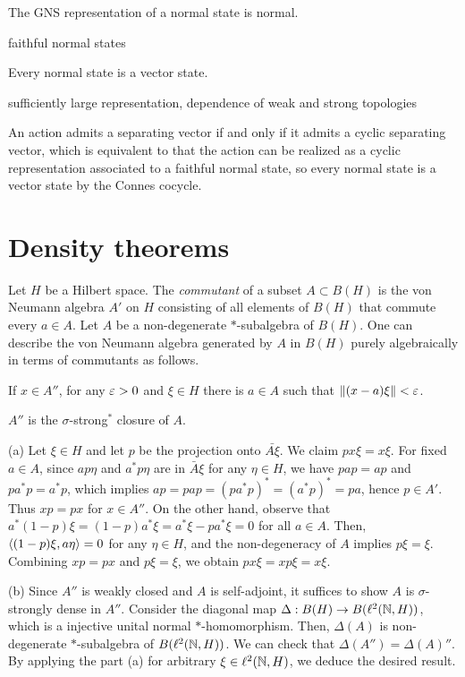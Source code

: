 \documentclass{../../large}
\begin{document}
\begin{prb}
\begin{parts}
\item The GNS representation of a normal state is normal.
\item faithful normal states
\item Every normal state is a vector state.
\item sufficiently large representation, dependence of weak and strong topologies
\end{parts}
\end{prb}


An action admits a separating vector if and only if it admits a cyclic separating vector, which is equivalent to that the action can be realized as a cyclic representation associated to a faithful normal state, so every normal state is a vector state by the Connes cocycle.

\section{Density theorems}



\begin{prb}
Let $H$ be a Hilbert space.
The \emph{commutant} of a subset $A\subset B(H)$ is the von Neumann algebra $A'$ on $H$ consisting of all elements of $B(H)$ that commute every $a\in A$.
Let $A$ be a non-degenerate $*$-subalgebra of $B(H)$.
One can describe the von Neumann algebra generated by $A$ in $B(H)$ purely algebraically in terms of commutants as follows.
\begin{parts}
\item If $x\in A''$, for any $\varepsilon>0$ and $\xi\in H$ there is $a\in A$ such that $\|(x-a)\xi\|<\varepsilon$.
\item $A''$ is the $\sigma$-strong$^*$ closure of $A$.
\end{parts}
\end{prb}
\begin{pf}
(a)
Let $\xi\in H$ and let $p$ be the projection onto $\bar{A\xi}$.
We claim $px\xi=x\xi$.
For fixed $a\in A$, since $ap\eta$ and $a^*p\eta$ are in $\bar A\xi$ for any $\eta\in H$, we have $pap=ap$ and $pa^*p=a^*p$, which implies $ap=pap=(pa^*p)^*=(a^*p)^*=pa$, hence $p\in A'$.
Thus $xp=px$ for $x\in A''$.
On the other hand, observe that $a^*(1-p)\xi=(1-p)a^*\xi=a^*\xi-pa^*\xi=0$ for all $a\in A$.
Then, $\langle(1-p)\xi,a\eta\rangle=0$ for any $\eta\in H$, and the non-degeneracy of $A$ implies $p\xi=\xi$.
Combining $xp=px$ and $p\xi=\xi$, we obtain $px\xi=xp\xi=x\xi$.

(b)
Since $A''$ is weakly closed and $A$ is self-adjoint, it suffices to show $A$ is $\sigma$-strongly dense in $A''$.
Consider the diagonal map $\Delta:B(H)\to B(\ell^2(\mathbb{N},H))$, which is a injective unital normal $*$-homomorphism.
Then, $\Delta(A)$ is non-degenerate $*$-subalgebra of $B(\ell^2(\mathbb{N},H))$.
We can check that $\Delta(A'')=\Delta(A)''$.
By applying the part (a) for arbitrary $\xi\in\ell^2(\mathbb{N},H)$, we deduce the desired result.
\end{pf}
\end{document}
